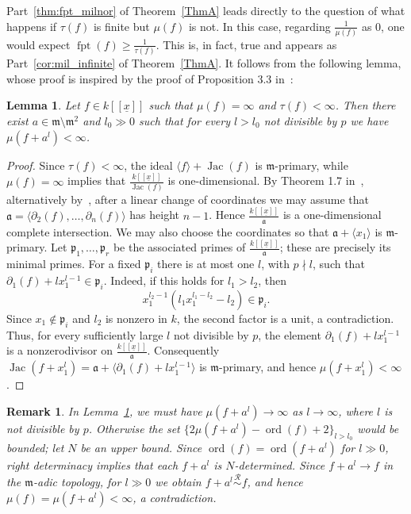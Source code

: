 \documentclass{article}
\newtheorem{lemma}[theorem]{Lemma}
\newtheorem{remark}[theorem]{Remark}
\DeclareMathOperator{\ord}{ord}
\DeclareMathOperator{\Jac}{Jac}
\DeclareMathOperator{\fpt}{fpt}
\newcommand{\kx}{k[[\underline{x}]]}
\newcommand{\equivr}{\overset{\mathcal{R}}{\sim}}
\numberwithin{theorem}{section}
\begin{document}
Part~\ref{thm:fpt_milnor} of Theorem~\ref{ThmA} leads directly to the question of what happens if $\tau(f)$ is finite but $\mu(f)$ is not. In this case, regarding $\frac{1}{\mu(f)}$ as $0$, one would expect $\fpt(f)\geq\frac{1}{\tau(f)}$. This is, in fact, true and appears as Part~\ref{cor:mil_infinite} of Theorem~\ref{ThmA}. It follows from the following lemma, whose proof is inspired by the proof of Proposition 3.3 in~\cite{pellikaan1989series}:

\begin{lemma}\label{lem:milnor_limit}
Let $f\in\kx$ such that $\mu(f)=\infty$ and $\tau(f)<\infty$. Then there exist $a\in\mathfrak{m}\setminus\mathfrak{m}^2$ and $l_0\gg0$ such that for every $l>l_0$ not divisible by $p$ we have $\mu(f+a^l)<\infty$.
\end{lemma}

\begin{proof}
Since $\tau(f)<\infty$, the ideal $\langle f\rangle+\Jac(f)$ is $\mathfrak{m}$-primary, while $\mu(f)=\infty$ implies that $\frac{\kx}{\Jac(f)}$ is one-dimensional. By Theorem 1.7 in~\cite{ulrich1987theory}, alternatively by~\cite{huneke1987structure}, after a linear change of coordinates we may assume that $\mathfrak{a}=\langle\partial_2(f),\dots,\partial_n(f)\rangle$ has height $n-1$. Hence $\frac{\kx}{\mathfrak{a}}$ is a one-dimensional complete intersection. We may also choose the coordinates so that $\mathfrak{a}+\langle x_1\rangle$ is $\mathfrak{m}$-primary. Let $\mathfrak{p}_1,\dots,\mathfrak{p}_r$ be the associated primes of $\frac{\kx}{\mathfrak{a}}$; these are precisely its minimal primes. For a fixed $\mathfrak{p}_i$ there is at most one $l$, with $p\nmid l$, such that $\partial_1(f)+lx_1^{l-1}\in\mathfrak{p}_i$. Indeed, if this holds for $l_1>l_2$, then
\[
x_1^{l_2-1}(l_1x_1^{l_1-l_2}-l_2)\in\mathfrak{p}_i.
\]
Since $x_1\notin\mathfrak{p}_i$ and $l_2$ is nonzero in $k$, the second factor is a unit, a contradiction. Thus, for every sufficiently large $l$ not divisible by $p$, the element $\partial_1(f)+lx_1^{l-1}$ is a nonzerodivisor on $\frac{\kx}{\mathfrak{a}}$. Consequently $\Jac(f+x_1^l)=\mathfrak{a}+\langle\partial_1(f)+lx_1^{l-1}\rangle$ is $\mathfrak{m}$-primary, and hence $\mu(f+x_1^l)<\infty$.
\end{proof}

\begin{remark}\label{rem:limit_milnor}
\textup{In Lemma~\ref{lem:milnor_limit}, we must have $\mu(f+a^l)\to\infty$ as $l\to\infty$, where $l$ is not divisible by $p$. Otherwise the set $\{2\mu(f+a^l)-\ord(f)+2\}_{l>l_0}$ would be bounded; let $N$ be an upper bound. Since $\ord(f)=\ord(f+a^l)$ for $l\gg0$, right determinacy implies that each $f+a^l$ is $N$-determined. Since $f+a^l\to f$ in the $\mathfrak{m}$-adic topology, for $l\gg0$ we obtain $f+a^l\equivr f$, and hence $\mu(f)=\mu(f+a^l)<\infty$, a contradiction.}
\end{remark}
\end{document}
